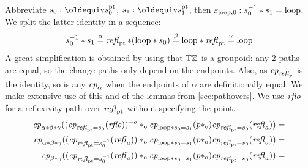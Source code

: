 \documentclass[a4,12pt]{amsart}
\begin{document}
Abbreviate $s_0 \defeq s^\pt_0$, $s_1 \defeq s^\pt_1$, 
then $\varepsilon_{\Zloop,0} : s_0^{-1} \ct s_1 = \Zloop$.
We split the latter identity in a sequence:
\[
s_0^{-1} \ct s_1 \stackrel{\alpha}{=} 
\refl{\pt}\ct(\Zloop\ct s_0) \stackrel{\beta}{=} 
\Zloop\ct\refl{\pt} \stackrel{\gamma}{=}  
\Zloop 
\]
A great simplification is obtained by using that $\TorZ$ is a groupoid:
any 2-paths are equal, so the change paths only depend on the endpoints.
Also, as $\cp{\refl{p}}$ is the identity, so is any $\cp{\alpha}$
when the endpoints of $\alpha$ are definitionally equal. We make extensive use 
of this and of the lemmas from \cref{sec:pathovers}.
We use $\rflo$ for a reflexivity path over $\refl{\pt}$ without specifying the point.
\begin{align*}\small
\cp{\alpha\ct\beta\ct\gamma}
((\cp{\refl{\pt} = s_0}(\rflo))^{-o} \cto
   \cp{\Zloop\ct s_0 = s_1}(p\cto )\cp{\refl{\pt} = s_0}(\refl{a}))=&\\
\cp{\alpha\ct\beta\ct\gamma}
((\cp{\refl{\pt} = s_0^{-1}}(\refl{a})) \cto
   \cp{\Zloop\ct s_0 = s_1}(p\cto )\cp{\refl{\pt} = s_0}(\refl{a}))=&\\
\cp{\beta\ct\gamma}
((\cp{\refl{\pt} = s_0^{-1}}(\refl{a})) \cto
   \cp{\Zloop\ct s_0 = s_1}(p\cto )\cp{\refl{\pt} = s_0}(\refl{a}))=&
\end{align*}




\end{document}
